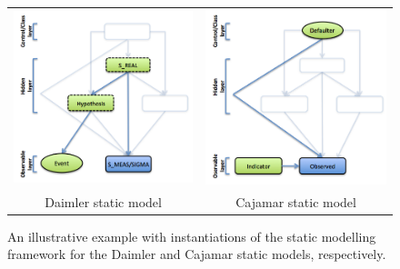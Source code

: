 \begin{figure}[ht!]
\begin{center}
\begin{tabular}{cc}
\includegraphics[scale=0.4]{./figures/DaimlerStaticModelling}
&
\includegraphics[scale=0.4]{./figures/CajaMarStaticModelling}
\\Daimler static model & Cajamar static model \\
\end{tabular}
\caption{\label{Figure:StaticModellingInstantiations} An illustrative example with instantiations of the static modelling framework for the Daimler and Cajamar static models, respectively.}
\end{center}
\end{figure}
